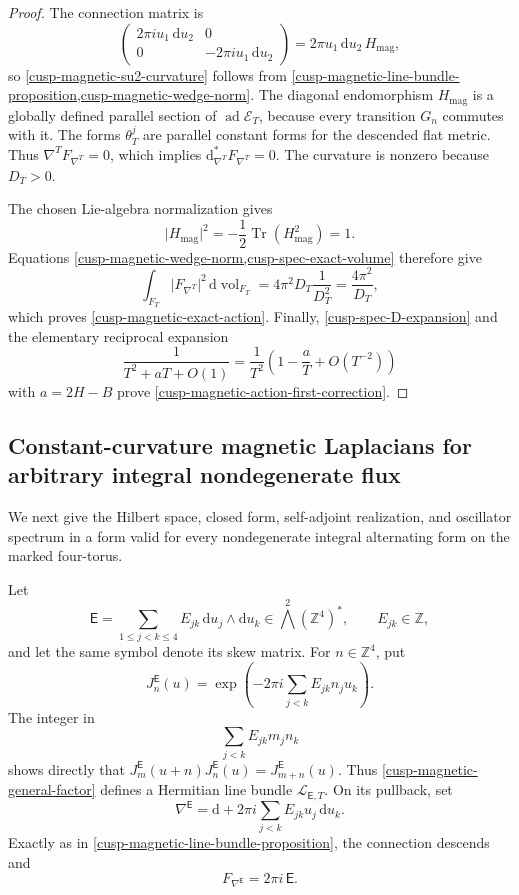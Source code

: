 \begin{proof}
The connection matrix is
\[
 \begin{pmatrix}
  2\pi i u_1\,\mathrm du_2&0\\
  0&-2\pi i u_1\,\mathrm du_2
 \end{pmatrix}
 =2\pi u_1\,\mathrm du_2\,H_{\mathrm{mag}},
\]
so \cref{cusp-magnetic-su2-curvature} follows from
\cref{cusp-magnetic-line-bundle-proposition,cusp-magnetic-wedge-norm}.
The diagonal endomorphism \(H_{\mathrm{mag}}\) is a
globally defined parallel section of \(\operatorname{ad}\mathscr E_T\),
because every transition \(G_n\) commutes with it.  The forms
\(\theta_T^j\) are parallel constant forms for the descended flat metric.
Thus \(\nabla^T F_{\nabla^T}=0\), which implies
\(\mathrm d_{\nabla^T}^*F_{\nabla^T}=0\).  The curvature is nonzero because
\(D_T>0\).

The chosen Lie-algebra normalization gives
\[
 \lvert H_{\mathrm{mag}}\rvert^2
 =-\frac12\operatorname{Tr}(H_{\mathrm{mag}}^2)=1.
\]
Equations \cref{cusp-magnetic-wedge-norm,cusp-spec-exact-volume} therefore
give
\[
 \int_{F_T}\lvert F_{\nabla^T}\rvert^2\,
   \mathrm d\operatorname{vol}_{F_T}
 =4\pi^2D_T\frac1{D_T^2}=\frac{4\pi^2}{D_T},
\]
which proves \cref{cusp-magnetic-exact-action}.  Finally,
\cref{cusp-spec-D-expansion} and the elementary reciprocal expansion
\[
 \frac1{T^2+aT+O(1)}
 =\frac1{T^2}\left(1-\frac aT+O(T^{-2})\right)
\]
with \(a=2H-B\) prove
\cref{cusp-magnetic-action-first-correction}.
\end{proof}

\subsection{Constant-curvature magnetic Laplacians for arbitrary integral
nondegenerate flux}

We next give the Hilbert space, closed form, self-adjoint realization, and
oscillator spectrum in a form valid for every nondegenerate integral
alternating form on the marked four-torus.

Let
\[
 \mathsf E=\sum_{1\le j<k\le4}E_{jk}\,\mathrm du_j\wedge\mathrm du_k
 \in\bigwedge^2(\mathbb Z^4)^*,
 \qquad E_{jk}\in\mathbb Z,
\]
and let the same symbol denote its skew matrix.  For \(n\in\mathbb Z^4\),
put
\begin{equation}
 J_n^{\mathsf E}(u)
 =\exp\!\left(-2\pi i\sum_{j<k}E_{jk}n_ju_k\right).
 \label{cusp-magnetic-general-factor}
\end{equation}
The integer in
\[
 \sum_{j<k}E_{jk}m_jn_k
\]
shows directly that
\(J_m^{\mathsf E}(u+n)J_n^{\mathsf E}(u)=J_{m+n}^{\mathsf E}(u)\).
Thus \eqref{cusp-magnetic-general-factor} defines a Hermitian line bundle
\(\mathscr L_{\mathsf E,T}\).  On its pullback, set
\begin{equation}
 \nabla^{\mathsf E}
 =\mathrm d+2\pi i\sum_{j<k}E_{jk}u_j\,\mathrm du_k.
 \label{cusp-magnetic-general-connection}
\end{equation}
Exactly as in \cref{cusp-magnetic-line-bundle-proposition}, the
connection descends and
\begin{equation}
 F_{\nabla^{\mathsf E}}=2\pi i\,\mathsf E.
 \label{cusp-magnetic-general-curvature}
\end{equation}

